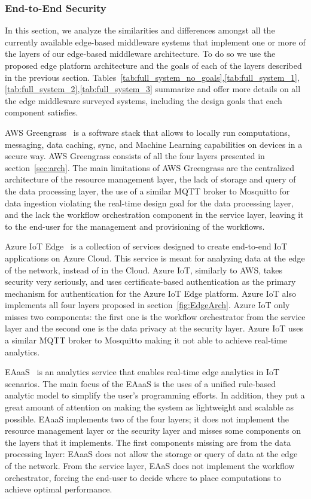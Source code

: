 \subsubsection{End-to-End Security}

In this section, we analyze the similarities and differences amongst all the currently available edge-based middleware systems that implement one or more of the layers of our edge-based middleware architecture. To do so we use the proposed edge platform architecture and the goals of each of the layers described in the previous section. Tables~\ref{tab:full_system_no_goals},\ref{tab:full_system_1},\ref{tab:full_system_2},\ref{tab:full_system_3} summarize and offer more details on all the edge middleware surveyed systems, including the design goals that each component satisfies.

AWS Greengrass~\cite{greengrass} is a software stack that allows to locally run computations, messaging, data caching, sync, and Machine Learning  capabilities on devices in a secure way. AWS Greengrass consists of all the four layers presented in section~\ref{sec:arch}. The main limitations of AWS Greengrass are the centralized architecture of the resource management layer, the lack of storage and query of the data processing layer, the use of a similar MQTT broker to Mosquitto for data ingestion violating the real-time design goal for the data processing layer, and the lack the workflow orchestration component in the service layer, leaving it to the end-user for the management and provisioning of the workflows.

Azure IoT Edge~\cite{azure} is a collection of services designed to create end-to-end IoT applications on Azure Cloud. This service is meant for analyzing data at the edge of the network, instead of in the Cloud. Azure IoT, similarly to AWS, takes security very seriously, and uses certificate-based authentication as the primary mechanism for authentication for the Azure IoT Edge platform. Azure IoT also implements all four layers proposed in section~\ref{fig:EdgeArch}. Azure IoT only misses two components: the first one is the workflow orchestrator from the service layer and the second one is the data privacy at the security layer. Azure IoT uses a similar MQTT broker to Mosquitto making it not able to achieve real-time analytics.

EAaaS~\cite{8029781} is an analytics service that enables real-time edge analytics in IoT scenarios. The main focus of the EAaaS is the uses of a unified rule-based analytic model to simplify the user's programming efforts. In addition, they put a great amount of attention on making the system as lightweight and scalable as possible. EAaaS implements two of the four layers; it does not implement the resource management layer or the security layer and misses some components on the layers that it implements. The first components missing are from the data processing layer: EAaaS does not allow the storage or query of data at the edge of the network. From the service layer, EAaS does not implement the workflow orchestrator, forcing the end-user to decide where to place computations to achieve optimal performance.

